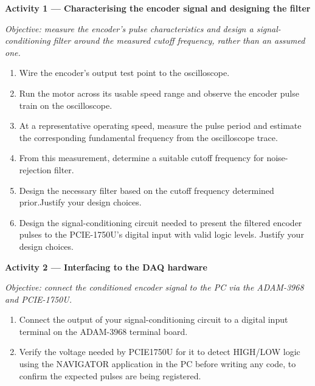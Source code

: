 \begin{procedure}

  \textbf{Activity 1 --- Characterising the encoder signal and designing the filter}\vspace{2pt}

  \textit{Objective: measure the encoder's pulse characteristics and design a signal-conditioning filter around the measured cutoff frequency, rather than an assumed one.}

  \begin{enumerate}
    \item Wire the encoder's output test point to the oscilloscope.
    \item Run the motor across its usable speed range and observe the encoder pulse train on the oscilloscope.
    \item At a representative operating speed, measure the pulse period and estimate the corresponding fundamental frequency from the oscilloscope trace.
    \item From this measurement, determine a suitable cutoff frequency for noise-rejection filter.\newpage
    \item Design the necessary filter based on the cutoff frequency determined prior.Justify your design choices.
    \item Design the signal-conditioning circuit needed to present the filtered encoder pulses to the PCIE-1750U's digital input with valid logic levels. Justify your design choices.
  \end{enumerate}
  \vspace*{1.5em}

  \textbf{Activity 2 --- Interfacing to the DAQ hardware}\vspace{2pt}

  \textit{Objective: connect the conditioned encoder signal to the PC via the ADAM-3968 and PCIE-1750U.}

  \begin{enumerate}
    \item Connect the output of your signal-conditioning circuit to a digital input terminal on the ADAM-3968 terminal board.
    \item Verify the voltage needed by PCIE1750U for it to detect HIGH/LOW logic using the NAVIGATOR application in the PC before writing any code, to confirm the expected pulses are being registered.
  \end{enumerate}


\end{procedure}
